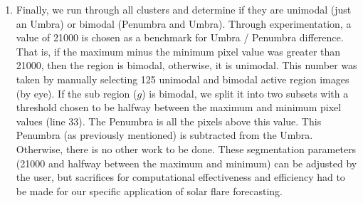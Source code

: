 \begin{enumerate}
    
    \item Finally, we run through all clusters and determine if they are unimodal (just an Umbra) or bimodal (Penumbra and Umbra). Through experimentation, a value of 21000 is chosen as a benchmark for Umbra / Penumbra difference. That is, if the maximum minus the minimum pixel value was greater than 21000, then the region is bimodal, otherwise, it is unimodal. This number was taken by manually selecting 125 unimodal and bimodal active region images (by eye). If the sub region ($g$) is bimodal, we split it into two subsets with a threshold chosen to be halfway between the maximum and minimum pixel values (line 33). The Penumbra is all the pixels above this value. This Penumbra (as previously mentioned) is subtracted from the Umbra. Otherwise, there is no other work to be done. These segmentation parameters (21000 and halfway between the maximum and minimum) can be adjusted by the user, but sacrifices for computational effectiveness and efficiency had to be made for our specific application of solar flare forecasting.
    

\end{enumerate}
